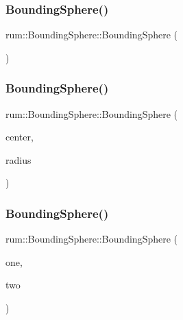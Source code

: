 \subsubsection{\texorpdfstring{Bounding\+Sphere()}{BoundingSphere()}\hspace{0.1cm}{\footnotesize\ttfamily [1/3]}}
{\footnotesize\ttfamily rum\+::\+Bounding\+Sphere\+::\+Bounding\+Sphere (\begin{DoxyParamCaption}{ }\end{DoxyParamCaption})}

\mbox{\label{classrum_1_1_bounding_sphere_adc0112926da70e6670fd75feb04ba1d0}} 
\subsubsection{\texorpdfstring{Bounding\+Sphere()}{BoundingSphere()}\hspace{0.1cm}{\footnotesize\ttfamily [2/3]}}
{\footnotesize\ttfamily rum\+::\+Bounding\+Sphere\+::\+Bounding\+Sphere (\begin{DoxyParamCaption}\item[{const glm\+::vec3 \&}]{center,  }\item[{\hyperlink{namespacerum_a7e8cca23573d5eaead0f138cbaa4862c}{real}}]{radius }\end{DoxyParamCaption})}

\mbox{\label{classrum_1_1_bounding_sphere_ad97a79a4d245770556b3526d3db9cad8}} 
\subsubsection{\texorpdfstring{Bounding\+Sphere()}{BoundingSphere()}\hspace{0.1cm}{\footnotesize\ttfamily [3/3]}}
{\footnotesize\ttfamily rum\+::\+Bounding\+Sphere\+::\+Bounding\+Sphere (\begin{DoxyParamCaption}\item[{const \hyperlink{classrum_1_1_bounding_sphere}{Bounding\+Sphere} \&}]{one,  }\item[{const \hyperlink{classrum_1_1_bounding_sphere}{Bounding\+Sphere} \&}]{two }\end{DoxyParamCaption})}

